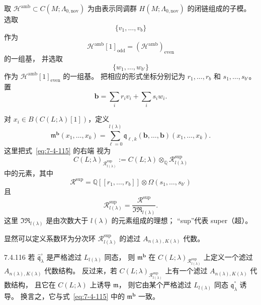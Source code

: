取
$\mathcal H^{\mathrm{amb}}
\subset C(M;\Lambda_{0,\mathrm{nov}})$
为由表示同调群
$H(M;\Lambda_{0,\mathrm{nov}})$
的闭链组成的子模。
选取
\[
\{v_1,\ldots,v_b\}
\]
作为
\[
\mathcal H^{\mathrm{amb}}[1]_{\mathrm{odd}}
=(\mathcal H^{\mathrm{amb}})_{\mathrm{even}}
\]
的一组基，
并选取
\[
\{w_1,\ldots,w_{b'}\}
\]
作为
$\mathcal H^{\mathrm{amb}}[1]_{\mathrm{even}}$
的一组基。
把相应的形式坐标分别记为
$r_1,\ldots,r_b$
和 $s_1,\ldots,s_{b'}$。
置
\[
\mathbf b
=\sum_i r_iv_i+\sum_i s_iw_i.
\]

对
$x_i\in B(C(L;\lambda)[1])$，定义
\begin{equation}
\mathfrak m^{\mathbf b}(x_1,\ldots,x_k)
=
\sum_{\ell=0}^{l(\lambda)}
\mathfrak q_{\ell,k}
(\mathbf b,\ldots,\mathbf b)
(x_1,\ldots,x_k).
\tag{7.4.115}\label{eq:7-4-115}
\end{equation}
这里把式~\eqref{eq:7-4-115} 的右端
视为
\[
C(L;\lambda)_{\mathcal R^{\mathrm{sup}}_{l(\lambda)}}
:=
C(L;\lambda)\otimes_{\mathbb Q}
\mathcal R^{\mathrm{sup}}_{l(\lambda)}
\]
中的元素，其中
\[
\mathcal R^{\mathrm{sup}}
=
\mathbb Q[[r_1,\ldots,r_b]]
\otimes\Omega(s_1,\ldots,s_{b'})
\]
且
\[
\mathcal R^{\mathrm{sup}}_{l(\lambda)}
=
\frac{\mathcal R^{\mathrm{sup}}}
{\mathfrak{IR}_{l(\lambda)}}.
\]
这里
$\mathfrak{IR}_{l(\lambda)}$
是由次数大于 $l(\lambda)$ 的元素组成的理想；
“sup”代表 super（超）。

显然可以定义系数环为分次环
$\mathcal R^{\mathrm{sup}}_{l(\lambda)}$
的滤过 $A_{n(\lambda),K(\lambda)}$ 代数。

\begin{lemma}{7.4.116}\label{lem:7-4-116}
若
$\widehat{\mathfrak q}^{\circ}_\lambda$
是严格滤过 $L_{l(\lambda)}$ 同态，
则 $\mathfrak m^{\mathbf b}$
在
$C(L;\lambda)_{\mathcal R^{\mathrm{sup}}_{l(\lambda)}}$
上定义一个滤过
$A_{n(\lambda),K(\lambda)}$ 代数结构。
反过来，若
$C(L;\lambda)_{\mathcal R^{\mathrm{sup}}_{l(\lambda)}}$
上有一个滤过
$A_{n(\lambda),K(\lambda)}$ 代数结构，
且它在 $C(L;\lambda)$ 上诱导 $\mathfrak m$，
则它由某个严格滤过
$L_{l(\lambda)}$ 同态
$\widehat{\mathfrak q}^{\circ}_\lambda$ 诱导。
换言之，它与式~\eqref{eq:7-4-115}
中的 $\mathfrak m^{\mathbf b}$ 一致。
\end{lemma}

